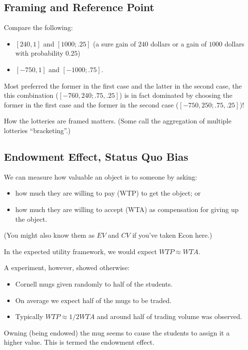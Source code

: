 \documentclass[oneside,reqno,letterpaper]{amsart}
\begin{document}
\subsection{Framing and Reference Point}
Compare the following:
\begin{itemize}
  \item \([240, 1]\) and \([1000; .25]\) (a sure gain of \(240\) dollars or a gain of \(1000\) dollars with probability \(0.25\))
  \item \([-750, 1]\) and \([-1000; .75]\). 
\end{itemize}
Most preferred the former in the first case and the latter in the second case, the this combination (\([-760, 240; .75, .25]\)) is in fact dominated by choosing the former in the first case and the former in the second case (\([-750, 250; .75, .25]\))!

How the lotteries are framed matters.
(Some call the aggregation of multiple lotteries ``bracketing''.)


\subsection{Endowment Effect, Status Quo Bias}
We can measure how valuable an object is to someone by asking:
\begin{itemize}
  \item how much they are willing to pay (WTP) to get the object; or
  \item how much they are willing to accept (WTA) as compensation for giving up the object.
\end{itemize}
(You might also know them as \(EV\) and \(CV\) if you've taken Econ here.)

In the expected utility framework, we would expect \(WTP \approx WTA\).

A \Textcite{Kahneman1991Endowment} experiment, however, showed otherwise:
\begin{itemize}
  \item Cornell mugs given randomly to half of the students. 
  \item On average we expect half of the mugs to be traded.
  \item Typically \(WTP \approx 1 / 2 WTA\) and around half of trading volume was observed. 
\end{itemize}
Owning (being endowed) the mug seems to cause the students to assign it a higher value.
This is termed the endowment effect.
\end{document}
